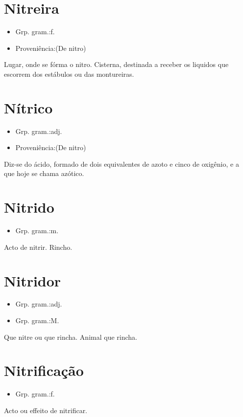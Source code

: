 \section{Nitreira}
\begin{itemize}
\item {Grp. gram.:f.}
\end{itemize}
\begin{itemize}
\item {Proveniência:(De \textunderscore nitro\textunderscore )}
\end{itemize}
Lugar, onde se fórma o nitro.
Cisterna, destinada a receber os liquidos que escorrem dos estábulos ou das montureiras.
\section{Nítrico}
\begin{itemize}
\item {Grp. gram.:adj.}
\end{itemize}
\begin{itemize}
\item {Proveniência:(De \textunderscore nitro\textunderscore )}
\end{itemize}
Diz-se do ácido, formado de dois equivalentes de azoto e cinco de oxigênio, e a que hoje se chama \textunderscore azótico\textunderscore .
\section{Nitrido}
\begin{itemize}
\item {Grp. gram.:m.}
\end{itemize}
Acto de nitrir.
Rincho.
\section{Nitridor}
\begin{itemize}
\item {Grp. gram.:adj.}
\end{itemize}
\begin{itemize}
\item {Grp. gram.:M.}
\end{itemize}
Que nitre ou que rincha.
Animal que rincha.
\section{Nitrificação}
\begin{itemize}
\item {Grp. gram.:f.}
\end{itemize}
Acto ou effeito de \textunderscore nitrificar\textunderscore .
